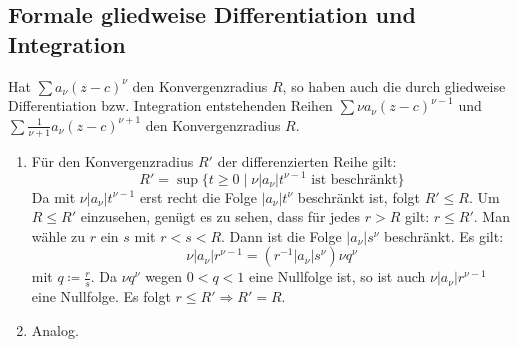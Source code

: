 \subsection*{Formale gliedweise Differentiation und Integration}
\begin{satz}
	Hat $ \sum a_\nu(z-c)^\nu $ den Konvergenzradius $ R $, so haben auch die durch gliedweise Differentiation bzw. Integration entstehenden Reihen $ \sum \nu a_\nu(z-c)^{\nu-1} $ und $ \sum\frac{1}{\nu+1}a_\nu(z-c)^{\nu+1} $ den Konvergenzradius $ R $.
\end{satz}
\begin{beweis}
	\begin{enumerate}
		\item F\"ur den Konvergenzradius $ R' $ der differenzierten Reihe gilt:
		\[ R'=\sup\lbrace t\geq 0\mid \nu|a_\nu|t^{\nu-1}\text{ ist beschr\"ankt}\rbrace \]
		Da mit $ \nu|a_\nu|t^{\nu-1} $ erst recht die Folge $ |a_\nu|t^\nu $ beschr\"ankt ist, folgt $ R'\leq R $. Um $ R\leq R' $ einzusehen, gen\"ugt es zu sehen, dass f\"ur jedes $ r>R $ gilt: $ r\leq R' $. Man w\"ahle zu $ r $ ein $ s $ mit $ r<s<R $. Dann ist die Folge $ |a_\nu|s^\nu $ beschr\"ankt. Es gilt:
		\[ \nu|a_\nu|r^{\nu-1}=(r^{-1}|a_\nu|s^\nu)\nu q^\nu \]
		mit $ q\coloneqq \frac{r}{s} $. Da $ \nu q^\nu $ wegen $ 0<q<1 $ eine Nullfolge ist, so ist auch $ \nu|a_\nu|r^{\nu-1} $ eine Nullfolge. Es folgt $ r\leq R'\Rightarrow R'=R $.
		\item Analog.
	\end{enumerate}
\end{beweis}

